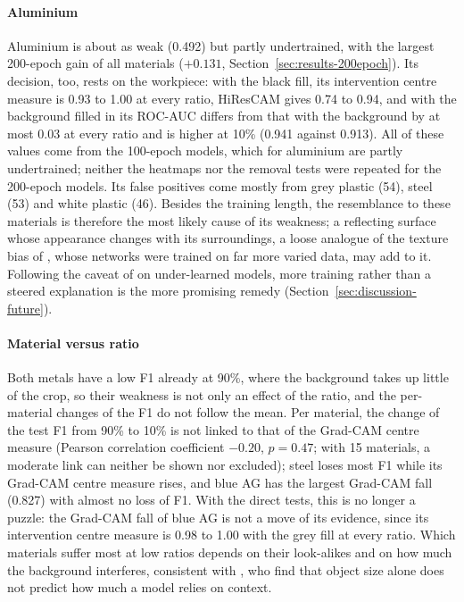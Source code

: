 \paragraph{Aluminium}
Aluminium is about as weak (0.492) but partly undertrained, with the largest 200-epoch
gain of all materials ($+0.131$, Section~\ref{sec:results-200epoch}). Its decision, too,
rests on the workpiece: with the black fill, its intervention centre measure is 0.93 to
1.00 at every ratio, HiResCAM gives 0.74 to 0.94, and with the background filled in its
ROC-AUC differs from that with the background by at most 0.03 at every ratio and is
higher at 10\% (0.941 against 0.913). All of these values come from the 100-epoch
models, which for aluminium are partly undertrained; neither the heatmaps nor the
removal tests were repeated for the 200-epoch models. Its false
positives come mostly from grey plastic (54), steel (53) and white plastic (46).
Besides the training length, the resemblance to these materials is therefore the most
likely cause of its weakness; a reflecting surface whose appearance changes with its
surroundings, a loose analogue of the texture bias of \citet{geirhos2019texture}, whose networks were trained on far more varied data, may
add to it. Following the caveat of \citet{le2025shortcut} on under-learned
models, more training rather than a steered explanation is the more promising remedy
(Section~\ref{sec:discussion-future}).

\paragraph{Material versus ratio}
Both metals have a low F1 already at 90\%, where the background takes up little of the
crop, so their weakness is not only an effect of the ratio, and the per-material changes
of the F1 do not follow the mean. Per material, the change of the test F1 from 90\% to
10\% is not linked to that of the Grad-CAM centre measure (Pearson correlation
coefficient $-0.20$, $p = 0.47$; with 15 materials, a moderate link can neither be shown
nor excluded); steel loses most F1 while its Grad-CAM centre measure
rises, and blue AG has the largest Grad-CAM fall (0.827) with almost no loss of F1. With
the direct tests, this is no longer a puzzle: the Grad-CAM fall of blue AG is not a move
of its evidence, since its intervention centre measure is 0.98 to 1.00 with the grey
fill at every ratio. Which materials suffer most at low ratios depends on their
look-alikes and on how much the background interferes, consistent with \citet{adhikari2024lostincontext}, who find that object size alone does not predict
how much a model relies on context.

